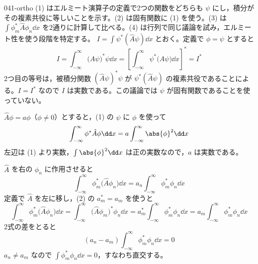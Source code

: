\documentclass[uplatex,dvipdfmx,a4paper,11pt]{jsarticle}
\begin{document}
\kaitouhen
{}
\begin{kaisetsu}{041-ortho}
\houshin (1) はエルミート演算子の定義で2つの関数をどちらも $\psi$ にし，積分がその複素共役に等しいことを示す。(2) は固有関数に (1) を使う。(3) は $\int\phi_{m}^{*}\hat{A}\phi_{n}\dd x$ を2通りに計算して比べる。(4) は行列で同じ議論を試み，エルミート性を使う段階を特定する。
\keisan {} $I=\int\psi^{*}(\hat{A}\psi)\dd x$ とおく。定義で $\phi=\psi$ とすると
\[
  I=\int_{-\infty}^{\infty}\bigl(\hat{A}\psi\bigr)^{*}\psi\dd x=\left[\int_{-\infty}^{\infty}\psi^{*}\bigl(\hat{A}\psi\bigr)\dd x\right]^{*}=I^{*}
\]
2つ目の等号は，被積分関数 $(\hat{A}\psi)^{*}\psi$ が $\psi^{*}(\hat{A}\psi)$ の複素共役であることによる。$I=I^{*}$ なので $I$ は実数である。この議論では $\psi$ が固有関数であることを使っていない。

 $\hat{A}\phi=a\phi$（$\phi\neq0$）とすると，(1) の $\psi$ に $\phi$ を使って
\[
  \int_{-\infty}^{\infty}\phi^{*}\hat{A}\phi\dd x=a\int_{-\infty}^{\infty}\abs{\phi}^{2}\dd x
\]
左辺は (1) より実数，$\int\abs{\phi}^{2}\dd x$ は正の実数なので，$a$ は実数である。

 $\hat{A}$ を右の $\phi_{n}$ に作用させると
\[
  \int_{-\infty}^{\infty}\phi_{m}^{*}\bigl(\hat{A}\phi_{n}\bigr)\dd x=a_{n}\int_{-\infty}^{\infty}\phi_{m}^{*}\phi_{n}\dd x
\]
定義で $\hat{A}$ を左に移し，(2) の $a_{m}^{*}=a_{m}$ を使うと
\[
  \int_{-\infty}^{\infty}\phi_{m}^{*}\bigl(\hat{A}\phi_{n}\bigr)\dd x=\int_{-\infty}^{\infty}\bigl(\hat{A}\phi_{m}\bigr)^{*}\phi_{n}\dd x=a_{m}^{*}\int_{-\infty}^{\infty}\phi_{m}^{*}\phi_{n}\dd x=a_{m}\int_{-\infty}^{\infty}\phi_{m}^{*}\phi_{n}\dd x
\]
2式の差をとると
\[
  (a_{n}-a_{m})\int_{-\infty}^{\infty}\phi_{m}^{*}\phi_{n}\dd x=0
\]
$a_{n}\neq a_{m}$ なので $\int\phi_{m}^{*}\phi_{n}\dd x=0$，すなわち直交する。


\end{kaisetsu}
\end{document}
